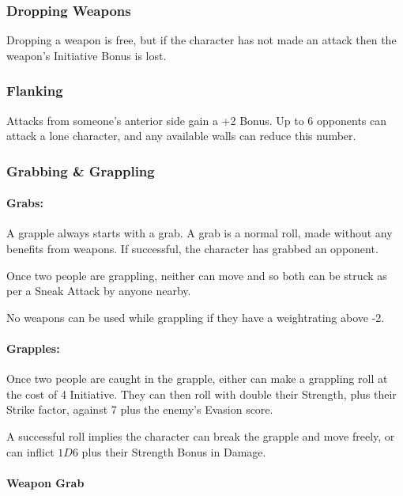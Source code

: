 \begin{multicols}{2}
\subsubsection{Dropping Weapons}

Dropping a weapon is free, but if the character has not made an attack then the weapon's Initiative Bonus is lost.

\subsubsection{Flanking}\label{flank}

Attacks from someone's anterior side gain a +2 Bonus.
Up to 6 opponents can attack a lone character, and any available walls can reduce this number.

\subsubsection{Grabbing \& Grappling}

\paragraph{Grabs:}

A grapple always starts with a grab.  A grab is a normal roll, made without any benefits from weapons.  If successful, the character has grabbed an opponent.

Once two people are grappling, neither can move and so both can be struck as per a Sneak Attack by anyone nearby.

No weapons can be used while grappling if they have a \gls{weightrating} above -2.

\paragraph{Grapples:}

Once two people are caught in the grapple, either can make a grappling roll at the cost of 4 Initiative.  They can then roll with double their Strength, plus their Strike factor, against 7 plus the enemy's Evasion score.

A successful roll implies the character can break the grapple and move freely, or can inflict $1D6$ plus their Strength Bonus in Damage.

\paragraph{Weapon Grab}


\end{multicols}
